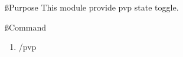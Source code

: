
\ss{Purpose}
This module provide pvp state toggle.

\ss{Command}
\begin{enumerate}
    \item /pvp
\end{enumerate}
